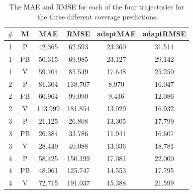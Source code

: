 \documentclass[twocolumn]{bmcart}%
\begin{document}
\begin{backmatter}
	
	\begin{table}[h]
		\caption{The MAE and RMSE for each of the four trajectories for the three different coverage predictions}
		\begin{tabular}{|c|c|c|c|c|c|}
			\hline
			\textbf{$\#$} & \textbf{M} & \textbf{MAE} & \textbf{RMSE} & \textbf{adaptMAE} & \textbf{adaptRMSE} \\ \hline
			1             & P          & 42.365       & 62.593        & 23.360            & 31.514             \\  \hline %
			1             & PB         & 50.315       & 69.985        & 23.127            & 29.142             \\  \hline  %
			1             & V          & 59.704       & 85.549        & 17.648            & 25.250             \\  \hline%
			2             & P          & 81.304       & 138.707       & 8.970             & 16.047             \\ \hline %
			2             & PB         & 60.964       & 99.090        & 9.436             & 12.086             \\   \hline%
			2             & V          & 113.999      & 181.854       & 13.029            & 16.932             \\  \hline %
			3             & P          & 21.125       & 26.808        & 13.305            & 17.799             \\   \hline%
			3             & PB         & 26.384       & 33.786        & 11.941            & 16.607             \\   \hline%
			3             & V          & 28.449       & 40.088        & 13.036            & 18.781             \\  \hline%
			4             & P          & 58.425       & 150.199       & 17.081            & 22.000             \\  \hline%
			4             & PB         & 48.061       & 125.747       & 14.553            & 17.795             \\   \hline%
			4             & V          & 72.715       & 191.037       & 15.388            & 21.599             \\  \hline %
		\end{tabular}
		\label{table:results}
	\end{table}
	
	

\end{backmatter}
\end{document}
